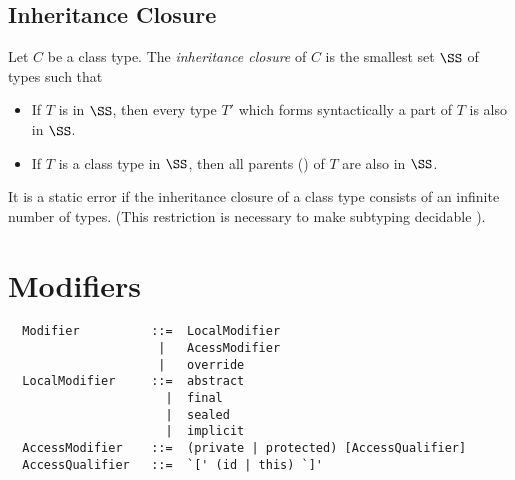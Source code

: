 \subsection{Inheritance Closure}\label{sec:inheritance-closure}

Let $C$ be a class type. The {\em inheritance closure} of $C$ is the
smallest set $\SS$ of types such that
\begin{itemize}
\item
If $T$ is in $\SS$, then every type $T'$ which forms syntactically
a part of $T$ is also in $\SS$.
\item
If $T$ is a class type in $\SS$, then all parents ()
of $T$ are also in $\SS$.
\end{itemize}
It is a static error if the inheritance closure of a class type
consists of an infinite number of types. (This restriction is
necessary to make subtyping decidable \cite{kennedy-pierce:decidable}).

\section{Modifiers}
\label{sec:modifiers}

\syntax\begin{lstlisting}
  Modifier          ::=  LocalModifier
                     |   AcessModifier
                     |   override
  LocalModifier     ::=  abstract
                      |  final
                      |  sealed
                      |  implicit
  AccessModifier    ::=  (private | protected) [AccessQualifier]
  AccessQualifier   ::=  `[' (id | this) `]'
\end{lstlisting}

